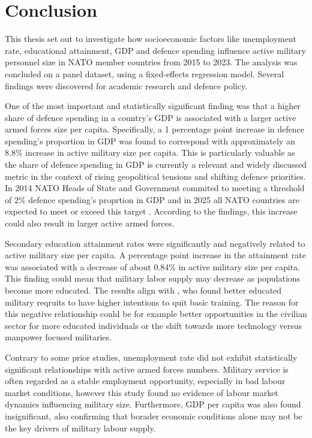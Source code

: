 \chapter{Conclusion}

This thesis set out to investigate how socioeconomic factors like unemployment rate, educational 
attainment, GDP and defence spending influence active military personnel size in NATO member countries 
from 2015 to 2023. The analysis was concluded on a panel dataset, using a fixed-effects regression model.
Several findings were discovered for academic research and defence policy.

One of the most important and statistically significant finding was that a higher share of defence 
spending in a country's GDP is associated with a larger active armed forces size per capita. Specifically, 
a 1 percentage point increase in defence spending's proportion in GDP was found to correspond with 
approximately an 8.8\% increase in active military size per capita.
This is particularly valuable as the share of defence spending in GDP is currently a relevant and 
widely discussed metric in the context of rising geopolitical tensions and shifting defence priorities.
In 2014 NATO Heads of State and Government commited to meeting a threshold of 2\% defence spending's 
proprtion in GDP and in 2025 all NATO countries are expected to meet or exceed this target \parencite{nato_defence_2025}. 
According to the findings, this increase could also result in larger active armed forces.

Secondary education attainment rates were significantly and negatively related to active military 
size per capita. A percentage point increase in the attainment rate was associated with a decrease 
of about 0.84\% in active military size per capita. This finding could mean that military labor 
supply may decrease as populations become more educated. The results align with \textcite{hof_quality_2023}, 
who found better educated military reqruits to have higher intentions to quit basic training.
The reason for this negative relationship could be for example better opportunities in the civilian 
sector for more educated individuals or the shift towards more technology versus manpower focused 
militaries.

Contrary to some prior studies, unemployment rate did not exhibit statistically significant 
relationships with active armed forces numbers. Military service is often regarded as a stable
employment opportunity, especially in bad labour market conditions, however this study found 
no evidence of labour market dynamics influencing military size. Furthermore, GDP per capita was 
also found insignificant, also confirming that borader economic conditions alone may not be the 
key drivers of military labour supply.

